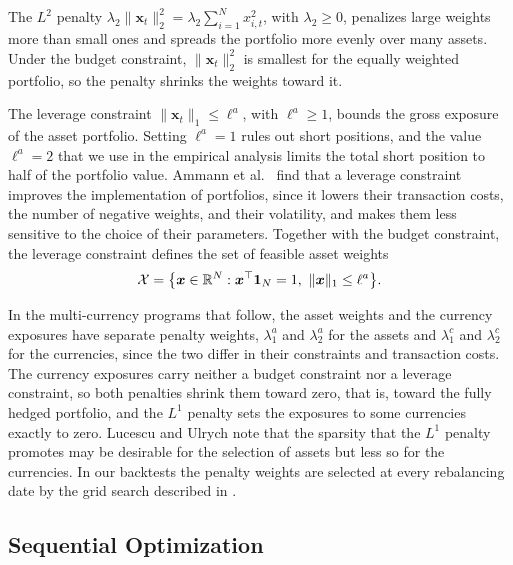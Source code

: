 The $L^2$ penalty $\lambda_2 \|\bm{x}_t\|_2^2 = \lambda_2 \sum_{i=1}^N x_{i,t}^2$, with $\lambda_2 \ge 0$, penalizes large
weights more than small ones and spreads the portfolio more evenly over many assets. Under the budget constraint,
$\|\bm{x}_t\|_2^2$ is smallest for the equally weighted portfolio, so the penalty shrinks the weights toward it. 

The leverage constraint $\|\bm{x}_t\|_1 \le \ell^a$, with $\ell^a \ge 1$, bounds the gross exposure of the asset
portfolio. Setting $\ell^a = 1$ rules out short positions, and the value $\ell^a = 2$ that we
use in the empirical analysis limits the total short position to half of the portfolio value. Ammann et
al.~\cite{AmmannCoqueretSchade2016} find that a leverage constraint improves the implementation of
portfolios, since it lowers their transaction costs, the number of negative weights, and their volatility, and makes them
less sensitive to the choice of their parameters. Together with the budget constraint, the leverage constraint
defines the set of feasible asset weights
\begin{equation*}
    \mathcal{X} = \bigl\{ \bm{x} \in \mathbb{R}^N : \bm{x}^\top \bm{1}_N = 1, \ \|\bm{x}\|_1 \le \ell^a \bigr\}.
\end{equation*}

In the multi-currency programs that follow, the asset weights and the currency exposures have separate penalty weights,
$\lambda_1^a$ and $\lambda_2^a$ for the assets and $\lambda_1^c$ and $\lambda_2^c$ for the currencies, since the two
differ in their constraints and transaction costs. The
currency exposures carry neither a budget constraint nor a leverage constraint, so both penalties shrink them toward
zero, that is, toward the fully hedged portfolio, and the $L^1$ penalty sets the exposures to some currencies exactly to
zero. Lucescu and Ulrych \cite{RegularizedMultiCurrencyExpectedShortfallPortfolios} note that the sparsity that the
$L^1$ penalty promotes may be desirable for the selection of assets but less so for the currencies. In our backtests the penalty weights
are selected at every rebalancing date by the grid search described in .


\subsection{Sequential Optimization}\label{sec:sequential-optimization}

